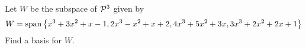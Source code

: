 \begin{applicationActivities}
\begin{activity}{10}
Let \(W\) be the subspace of \(\P^3\) given by
 \[W = \vspan \left\{x^3+3x^2+x-1, 2x^3-x^2+x+2, 4x^3+5x^2+3x, 3x^3+2x^2+2x+1 \right\} \]
 Find a basis for \(W\).
\end{activity}
\end{applicationActivities}
